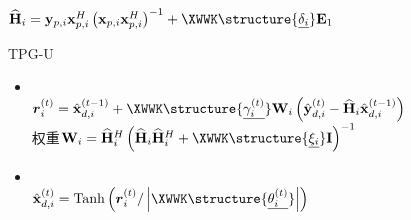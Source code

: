 \documentclass[aspectratio=169,xcolor=table,10pt]{ctexbeamer}
\renewcommand{\emph}[1]{{\XWWK \structure{#1}}}
\begin{document}
\begin{frame}
\begin{minipage}[m]{.4\textwidth}
\begin{overprint}
\begin{itemize}
                \vspace{3pt}$\widehat{\mathbf{H}}_{i}=\mathbf{y}_{p, i} \mathbf{x}_{p, i}^{H}\left(\mathbf{x}_{p, i} \mathbf{x}_{p, i}^{H}\right)^{-1}+\emph{\underline{\delta_{i} }} \mathbf{E}_{1}$
            \end{itemize}
        \begin{exampleblock}{}
            \raisebox{-1pt}{\structure{\faArrowCircleLeft}}\parbox{.95\textwidth}{\centering TPG-U}
            \end{exampleblock} 
            \begin{itemize}
                \item \emph{梯度下降}\\
                    $\boldsymbol{r}_{i}^{(t)}  =\hat{\mathbf{x}}_{d, i}^{(t-1)}+\emph{\underline{\gamma_{i}^{(t)}}} \mathbf{W}_{i}\left(\hat{\mathbf{y}}_{d, i}^{(t)}-\widehat{\mathbf{H}}_{i} \hat{\mathbf{x}}_{d, i}^{(t-1)}\right) $\\
                    {\small 权重$\mathbf{W}_{i}=\widehat{\mathbf{H}}_{i}^{H}\left(\widehat{\mathbf{H}}_{i} \widehat{\mathbf{H}}_{i}^{H}+\emph{\underline{\xi_{i} }}\mathbf{I}\right)^{-1}$}
                \item \emph{投影}\\
                    $\hat{\mathbf{x}}_{d, i}^{(t)}  =\operatorname{Tanh}\left(\boldsymbol{r}_{i}^{(t)} /\left|\emph{\underline{\theta_{i}^{(t)}}}\right|\right)$
            \end{itemize}
    \end{overprint}
    
    \end{minipage}

\end{frame}
\end{document}
